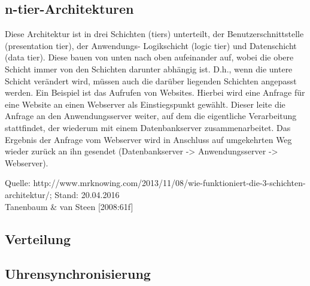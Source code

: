 \documentclass[a4paper]{scrartcl}
\begin{document}
\subsection{n-tier-Architekturen}
Diese Architektur ist in drei Schichten (tiers) unterteilt, der Benutzerschnittstelle (presentation tier), der Anwendungs- Logikschicht (logic tier) und Datenschicht (data tier). Diese bauen von unten nach oben aufeinander auf, wobei die obere Schicht immer von den Schichten darunter abhängig ist. D.h., wenn die untere Schicht verändert wird, müssen auch die darüber liegenden Schichten angepasst werden. Ein Beispiel ist das Aufrufen von Websites. Hierbei wird eine Anfrage für eine Website an einen Webserver als Einstiegspunkt gewählt. Dieser leite die Anfrage an den Anwendungsserver weiter, auf dem die eigentliche Verarbeitung stattfindet, der wiederum mit einem Datenbankserver zusammenarbeitet. Das Ergebnis der Anfrage vom Webserver wird in Anschluss auf umgekehrten Weg wieder zurück an ihn gesendet (Datenbankserver -> Anwendungsserver -> Webserver).

Quelle: http://www.mrknowing.com/2013/11/08/wie-funktioniert-die-3-schichten-architektur/; Stand: 20.04.2016 \\ Tanenbaum & van Steen [2008:61f]

\subsection{Verteilung}


\subsection{Uhrensynchronisierung}
\end{document}
